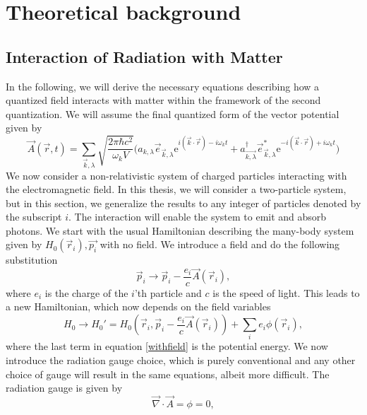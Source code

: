 \chapter{Theoretical background}
\section{Interaction of Radiation with Matter}\label{RadMatter}
In the following, we will derive the necessary equations describing how a quantized field interacts with matter within the framework of the second quantization. We will assume the final quantized form of the vector potential given by
\begin{equation} \label{quantized}
	\vec{A}(\vec{r},t) = \sum_{\vec{k},\lambda} \sqrt{\frac{2\pi\hbar c^2}{\omega_k V}} \bigg(a_{k,\lambda}\vec{e}_{\vec{k},\lambda}\text{e}^{i(\vec{k}\cdot \vec{r})-i\omega_k t}+a_{\vec{k,\lambda}}^\dagger\vec{e}_{\vec{k},\lambda}^*\text{e}^{-i(\vec{k}\cdot \vec{r})+i\omega_k t}\bigg)
\end{equation}
We now consider a non-relativistic system of charged particles interacting with the electromagnetic field. In this thesis, we will consider a two-particle system, but in this section, we generalize the results to any integer of particles denoted by the subscript $i$. The interaction will enable the system to emit and absorb photons. We start with the usual Hamiltonian describing the many-body system given by $H_0(\vec{r}_i),\vec{p_i}$ with no field. We introduce a field and do the following substitution 
\begin{equation} \label{substi}
	\vec{p}_i \rightarrow \vec{p}_i - \frac{e_i}{c}\vec{A}(\vec{r}_i),
\end{equation}
where $e_i$ is the charge of the $i$'th particle and $c$ is the speed of light. This leads to a new Hamiltonian, which now depends on the field variables
\begin{equation} \label{withfield}
	H_0 \rightarrow H_0' = H_0 \left( \vec{r}_i,\vec{p}_i-\frac{e_i}{c}\vec{A}(\vec{r}_i)\right) + \sum_i e_i \phi(\vec{r}_i),
\end{equation}
where the last term in equation \eqref{withfield} is the potential energy. We now introduce the radiation gauge choice, which is purely conventional and any other choice of gauge will result in the same equations, albeit more difficult. The radiation gauge is given by
\begin{equation} \label{RadiationGauge}
	\vec{\nabla}\cdot \vec{A} = \phi = 0,
\end{equation}
